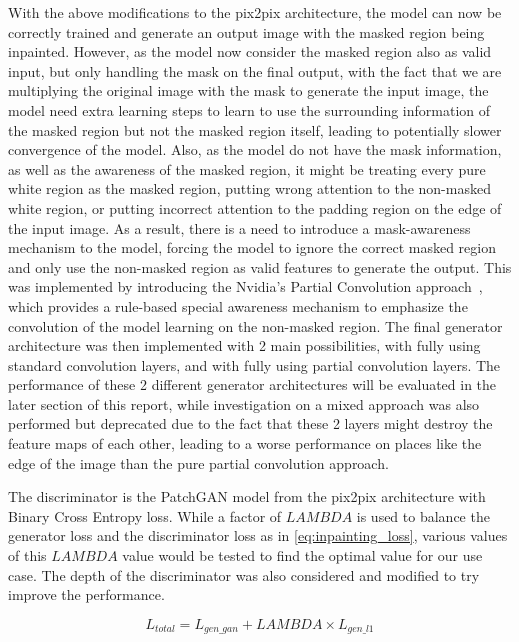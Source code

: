 \documentclass[10pt,twocolumn,letterpaper]{article}
\begin{document}
With the above modifications to the pix2pix architecture, the model can now be correctly trained and generate an output image with the masked region being inpainted. However, as the model now 
consider the masked region also as valid input, but only handling the mask on the final output, with the fact that we are multiplying the original image with the mask to generate the input image, 
the model need extra learning steps to learn to use the surrounding information of the masked region but not the masked region itself, leading to potentially slower convergence of the model. Also,
as the model do not have the mask information, as well as the awareness of the masked region, it might be treating every pure white region as the masked region, putting wrong attention to the 
non-masked white region, or putting incorrect attention to the padding region on the edge of the input image. As a result, there is a need to introduce a mask-awareness mechanism to the 
model, forcing the model to ignore the correct masked region and only use the non-masked region as valid features to generate the output. This was implemented by introducing the Nvidia's 
Partial Convolution approach~\cite{Liu2018}, which provides a rule-based special awareness mechanism to emphasize the convolution of the model learning on the non-masked region. The final 
generator architecture was then implemented with 2 main possibilities, with fully using standard convolution layers, and with fully using partial convolution layers. The performance of these 2 
different generator architectures will be evaluated in the later section of this report, while investigation on a mixed approach was also performed but deprecated due to the fact that these 2 layers 
might destroy the feature maps of each other, leading to a worse performance on places like the edge of the image than the pure partial convolution approach.

The discriminator is the PatchGAN model from the pix2pix architecture with Binary Cross Entropy loss. While a factor of $LAMBDA$ is used to balance the generator loss and the discriminator loss as in 
\cref{eq:inpainting_loss}, various values of this $LAMBDA$ value would be tested to find the optimal value for our use case. The depth of the discriminator was also considered and modified to try 
improve the performance.  

\begin{equation}
    L_{total} = L_{gen\_gan} + LAMBDA \times L_{gen\_l1}
    \label{eq:inpainting_loss}
\end{equation}
\end{document}
